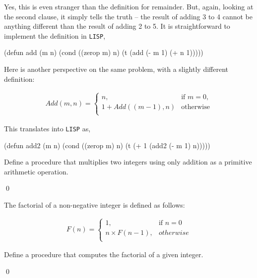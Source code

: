 \documentclass[a4paper,11pt]{article}
\begin{document}
\begin{uenum}
Yes, this is even stranger than the definition for remainder. But, again, looking at the second clause, it simply tells the truth -- the result of adding 3 to 4 cannot be anything different than the result of adding 2 to 5. It is straightforward to implement the definition in \Verb+LISP+,

\begin{lispcode}
(defun add (m n)
  (cond  ((zerop m) n)
         (t (add (- m 1) (+ n 1)))))
\end{lispcode}

\item Here is another perspective on the same problem, with a slightly different definition:

\begin{align}
Add(m,n) =  
\begin{cases}
n, & \text{if } m = 0, \\
	1 + Add((m - 1),n) & \text{otherwise}\\
\end{cases}
\end{align}

This translates into \Verb+LISP+ as,

\begin{lispcode}
(defun add2 (m n)
  (cond ((zerop m) n)
        (t (+ 1 (add2 (- m 1) n)))))
\end{lispcode}

\end{uenum}

\noindent\hrulefill

\begin{uexercise}
Define a procedure that multiplies two integers using only addition as a primitive arithmetic operation.

\qed
\end{uexercise}

\begin{uexercise}

The factorial of a non-negative integer is defined as follows:

\begin{align}
F(n) =  
\begin{cases}
1, & \text{if }n = 0\\
n \times F(n-1), & otherwise \\
\end{cases}
\end{align}

Define a procedure that computes the factorial of a given integer.

\qed
\end{uexercise}
\end{document}
